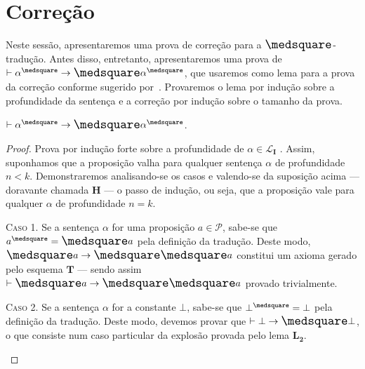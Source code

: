 \section{Correção}

    Neste sessão, apresentaremos uma prova de correção para a $\nec$-tradução. Antes disso, entretanto, apresentaremos uma prova de $\entails\alpha^\medsquare\to\nec\alpha^\medsquare$, que usaremos como lema para a prova da correção conforme sugerido por~\cite{Troelstra}. Provaremos o lema por indução sobre a profundidade da sentença e a correção por indução sobre o tamanho da prova.

    \begin{lemma}\label{square-nec}
        $\entails\alpha^\medsquare\to\nec\alpha^\medsquare$.

        \begin{proof}
            Prova por indução forte sobre a profundidade de $\alpha\in\mathcal{L}_\mathbf{I}$ \citep{Troelstra}.
            Assim, suponhamos que a proposição valha para qualquer sentença $\alpha$ de profundidade $n<k$.
            Demonstraremos analisando-se os casos e valendo-se da suposição acima --- doravante chamada $\mathbf{H}$ --- o passo de indução, ou seja, que a proposição vale para qualquer $\alpha$ de profundidade $n=k$.

            \begin{case}
                \textsc{Caso 1.}
                Se a sentença $\alpha$ for uma proposição $a\in\mathcal{P}$, sabe-se que $a^\medsquare=\nec a$ pela definição da tradução.
                Deste modo, $\nec{a}\to\nec\nec{a}$ constitui um axioma gerado pelo esquema \hyperref[MB2]{$\mathbf{T}$} --- sendo assim $\entails\nec{a}\to\nec\nec{a}$ provado trivialmente.
            \end{case}

            \begin{case}
                \textsc{Caso 2.}
                Se a sentença $\alpha$ for a constante $\bot$, sabe-se que $\bot^\medsquare=\bot$ pela definição da tradução.
                Deste modo, devemos provar que $\entails\bot\to\nec\bot$, o que consiste num caso particular da explosão provada pelo lema \hyperref[explosion]{$\mathbf{L_2}$}.
            \end{case}


\end{proof}
\end{lemma}
